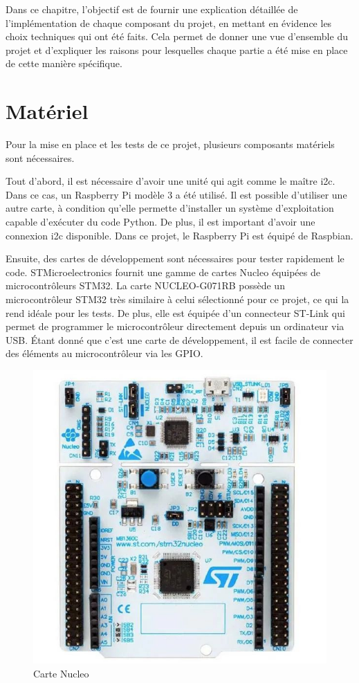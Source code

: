 Dans ce chapitre, l'objectif est de fournir une explication détaillée de l'implémentation de chaque composant du projet, en mettant en évidence les choix techniques qui ont été faits.
Cela permet de donner une vue d'ensemble du projet et d'expliquer les raisons pour lesquelles chaque partie a été mise en place de cette manière spécifique.

\section{Matériel}

Pour la mise en place et les tests de ce projet, plusieurs composants matériels sont nécessaires.

Tout d'abord, il est nécessaire d'avoir une unité qui agit comme le maître \gls{i2c}.
Dans ce cas, un Raspberry Pi modèle 3 a été utilisé.
Il est possible d'utiliser une autre carte, à condition qu'elle permette d'installer un système d'exploitation capable d'exécuter du code Python.
De plus, il est important d'avoir une connexion \gls{i2c} disponible.
Dans ce projet, le Raspberry Pi est équipé de Raspbian.

Ensuite, des cartes de développement sont nécessaires pour tester rapidement le code.
STMicroelectronics fournit une gamme de cartes Nucleo équipées de microcontrôleurs STM32.
La carte NUCLEO-G071RB possède un microcontrôleur STM32 très similaire à celui sélectionné pour ce projet, ce qui la rend idéale pour les tests.
De plus, elle est équipée d'un connecteur ST-Link qui permet de programmer le microcontrôleur directement depuis un ordinateur via USB.
Étant donné que c'est une carte de développement, il est facile de connecter des éléments au microcontrôleur via les GPIO.

\begin{figure}[H]
    \centering
    \includegraphics[scale=0.2]{./assets/figures/nucleo.jpg}
    \caption{\cite{nucleo} Carte Nucleo}
\end{figure}

